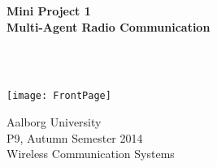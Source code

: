 \begin{center}
	\vspace*{1.5cm}
	
	\begin{Huge}
		\textbf{Mini Project 1\\
		Multi-Agent Radio Communication}
	\end{Huge}\\~\\
	
	\vspace*{2cm}
	
	\texttt{[image: FrontPage]}
	\vspace*{2cm}
    
	Aalborg University\\
	P9, Autumn Semester 2014\\
	Wireless Communication Systems\\
\end{center}